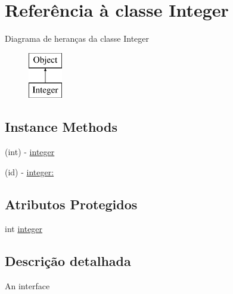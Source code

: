 \hypertarget{interface_integer}{\section{Referência à classe Integer}
\label{interface_integer}
}
Diagrama de heranças da classe Integer\begin{figure}[H]
\begin{center}
\leavevmode
\includegraphics[height=2.000000cm]{interface_integer}
\end{center}
\end{figure}
\subsection*{Instance Methods}
\begin{DoxyCompactItemize}
\item 
(int) -\/ \hyperlink{interface_integer_a1d91bf3b439b10037a6baf4c0018058e}{integer}
\item 
(id) -\/ \hyperlink{interface_integer_ab4fd5938ef37fbc93d6207135c1ca91c}{integer\-:}
\end{DoxyCompactItemize}
\subsection*{Atributos Protegidos}
\begin{DoxyCompactItemize}
\item 
int \hyperlink{interface_integer_adece183191b0e700e039e59101e06105}{integer}
\end{DoxyCompactItemize}


\subsection{Descrição detalhada}
An interface 

